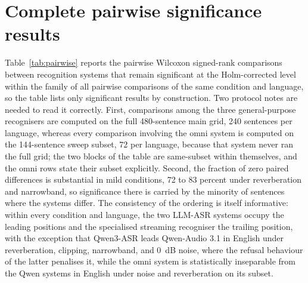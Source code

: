 \section{Complete pairwise significance results}
\label{app:significance}

Table~\ref{tab:pairwise} reports the pairwise Wilcoxon signed-rank
comparisons between recognition systems that remain significant at the
Holm-corrected level within the family of all pairwise comparisons of the
same condition and language, so the table lists only significant results
by construction. Two protocol notes are needed to read it correctly.
First, comparisons among the three general-purpose recognisers are computed
on the full 480-sentence main grid, 240 sentences per language, whereas
every comparison involving the omni system is computed on the 144-sentence
sweep subset, 72 per language, because that system never ran the full grid;
the two blocks of the table are same-subset within themselves, and the
omni rows state their subset explicitly. Second, the fraction of zero
paired differences is substantial in mild conditions, 72 to 83 percent
under reverberation and narrowband, so significance there is carried by
the minority of sentences where the systems differ. The consistency of
the ordering is itself informative: within every condition and language,
the two LLM-ASR systems occupy the leading positions and the specialised
streaming recogniser the trailing position, with the exception that
Qwen3-ASR leads Qwen-Audio 3.1 in English under reverberation, clipping,
narrowband, and 0~dB noise, where the refusal behaviour of the latter
penalises it, while the omni system is statistically inseparable from the
Qwen systems in English under noise and reverberation on its subset.

